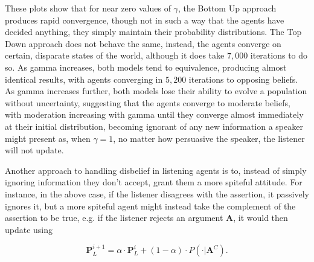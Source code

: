 These plots show that for near zero values of $\gamma$, the Bottom Up approach produces rapid convergence, though not in such a way that the agents have decided anything, they simply maintain their probability distributions. The Top Down approach does not behave the same, instead, the agents converge on certain, disparate states of the world, although it does take $7,000$ iterations to do so. As gamma increases, both models tend to equivalence, producing almost identical results, with agents converging in $5,200$ iterations to opposing beliefs. As gamma increases further, both models lose their ability to evolve a population without uncertainty, suggesting that the agents converge to moderate beliefs, with moderation increasing with gamma until they converge almost immediately at their initial distribution, becoming ignorant of any new information a speaker might present as, when $\gamma = 1$, no matter how persuasive the speaker, the listener will not update. 


Another approach to handling disbelief in listening agents is to, instead of simply ignoring information they don't accept, grant them a more spiteful attitude. For instance, in the above case, if the listener disagrees with the assertion, it passively ignores it, but a more spiteful agent might instead take the complement of the assertion to be true, e.g. if the listener rejects an argument $\mathbf{A}$, it would then update using  

\begin{equation}
    \mathbf{P}^{i+1}_L = \alpha \cdot \mathbf{P}^{i}_L + (1 - \alpha) \cdot P(\cdot | \mathbf{A}^C). 
\end{equation}


